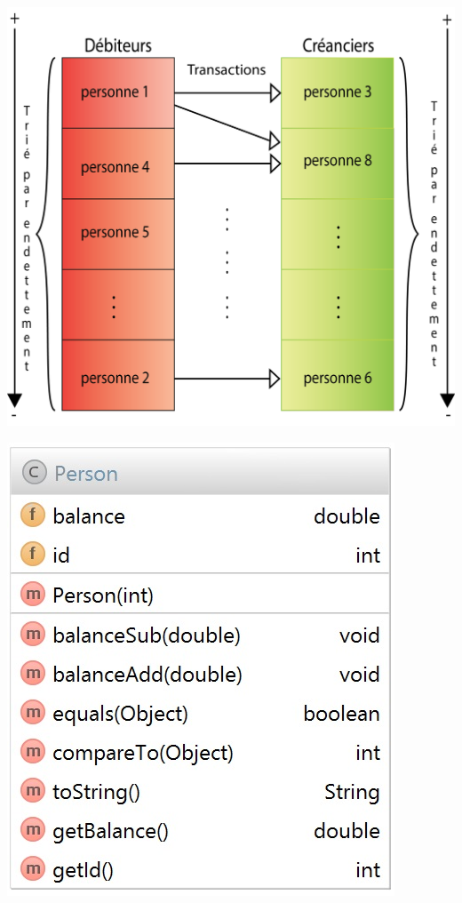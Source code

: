 \documentclass[12pt, a4paper, table]{article}
\begin{document}
\noindent \begin{minipage}{0.5 \textwidth}
\begin{center}
\includegraphics[scale=0.33]{sch}
\label{image-tigre}
\end{center}
\end{minipage}
\begin{minipage}{0.5 \textwidth}
\begin{center}
\includegraphics[scale=0.33]{per2}
\label{image-tigre}
\end{center}
\end{minipage}
\end{document}

